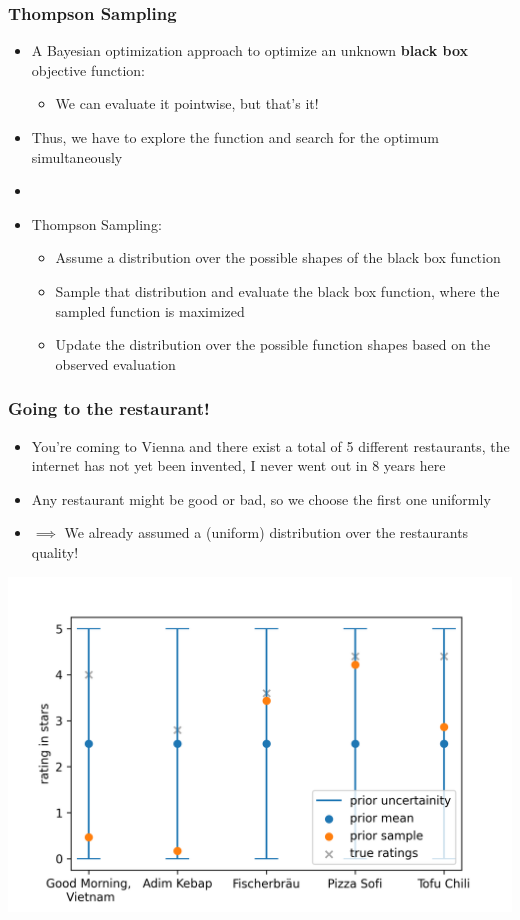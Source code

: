 \begin{frame}[c]
    \frametitle{Thompson Sampling}
    \begin{itemize}
        \item A Bayesian optimization approach to optimize an unknown \textbf{black box} objective function:
        \begin{itemize}
            \item We can evaluate it pointwise, but that's it!
        \end{itemize}
        \item Thus, we have to explore the function and search for the optimum simultaneously
        \item[]
        \item Thompson Sampling:
        \begin{itemize}
            \item Assume a distribution over the possible shapes of the black box function
            \item Sample that distribution and evaluate the black box function, where the sampled function is maximized
            \item Update the distribution over the possible function shapes based on the observed evaluation
        \end{itemize}
    \end{itemize}
\end{frame}

\begin{frame}[c]
    \frametitle{Going to the restaurant!}
    \begin{itemize}
        \item You're coming to Vienna and there exist a total of 5 different restaurants, the internet has not yet been invented, I never went out in 8 years here
        \item Any restaurant might be good or bad, so we choose the first one uniformly
        \item[] $\implies$ We already assumed a (uniform) distribution over the restaurants quality!
    \end{itemize}
    \vspace{-.5cm}
    \begin{center}
        \includegraphics[scale=0.5]{imgs/restaurantsprior.png}
    \end{center}
\end{frame}

